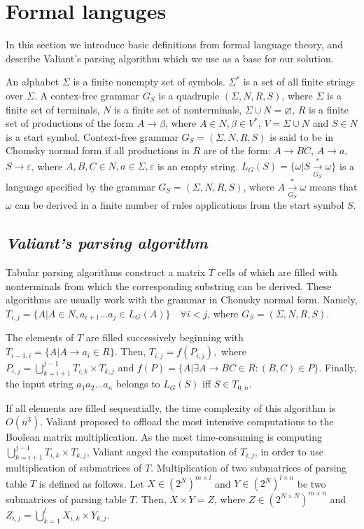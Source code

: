 \section{\bf Formal languges}

In this section we introduce basic definitions from formal language theory, and describe Valiant's parsing algorithm which we use as a base for our solution.

An alphabet $\Sigma$ is a finite nonempty set of symbols.
$\Sigma^{*}$ is a set of all finite strings over $\Sigma$.
A contex-free grammar $G_S$ is a quadruple $(\Sigma, N, R, S)$, where $\Sigma$ is a finite set of terminals, $N$ is a finite set of nonterminals, $\Sigma \cup N = \varnothing$, $R$ is a finite set of productions of the form $A \rightarrow \beta$, where $A \in N, \beta \in V^{*}$, $V = \Sigma \cup N$ and $S \in N$ is a start symbol.
Context-free grammar $G_S = (\Sigma, N, R, S)$ is said to be in Chomsky normal form if all productions in $R$ are of the form: $A \rightarrow BC$, $A \rightarrow a$, $S \rightarrow \varepsilon$, where $A, B, C \in N, a \in \Sigma, \varepsilon$ is an empty string.
$L_{G}(S) = \{ \omega | S\xrightarrow[G_S]{*} \omega\}$ is a language specified by the grammar $G_{S} = (\Sigma, N, R, S)$, where $A \xrightarrow[G_S]{*} \omega$ means that $\omega$ can be derived in a finite number of rules applications from the start symbol $S$.

\subsection{\bf \it Valiant's parsing algorithm}

Tabular parsing algorithms construct a matrix $T$ cells of which are filled with nonterminals from which the corresponding substring can be derived. 
These algorithms are usually work with the grammar in Chomsky normal form.
Namely, $T_{i, j} =  \{ A | A \in N, a_{i + 1} \dots a_{j} \in L_{G}(A)\} \quad \forall i < j$, where $G_S=(\Sigma, N, R, S)$.

The elements of $T$ are filled successively beginning with $T_{i - 1, i} = \{ A | A \rightarrow a_{i} \in R\}.$
Then, $T_{i, j} = f(P_{i, j}),$ where
$P_{i, j} = \bigcup\limits_{k = i + 1}^{j - 1} T_{i,k} \times T_{k, j}$ and
$f(P) = \{A | \exists A \rightarrow BC \in R : (B, C) \in P\}.$
Finally, the input string $a_{1}a_{2} \dots a_{n}$ belongs to $L_{G}(S)$ iff $S \in T_{0, n}$.

If all elements are filled sequentially, the time complexity of this algorithm is $O(n^3)$.
Valiant proposed to offload the most intensive computations to the Boolean matrix multiplication. 
As the most time-consuming is computing $\bigcup\limits_{k = i + 1}^{j - 1} T_{i, k} \times T_{k, j}$, Valiant anged the computation of $T_{i, j}$, in order to use multiplication of submatrices of $T$.
Multiplication of two submatrices of parsing table $T$ is defined as follows.
Let $X \in (2^N)^{m \times l}$ and $Y \in (2^N)^{l \times n}$ be two submatrices of parsing table $T$. 
Then, $X \times Y = Z$, where $Z \in (2^{N \times N})^{m \times n}$ and $Z_{i, j} = \bigcup\limits_{k = 1}^{l} X_{i, k} \times Y_{k, j}$.

